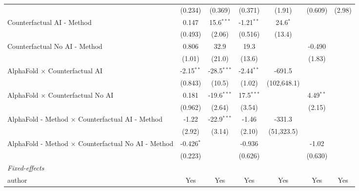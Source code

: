 \begin{tabular}{lcccccc}
                                                              & (0.234)       & (0.369)       & (0.371)      & (1.91)      & (0.609)      & (2.98)\\   
   Counterfactual AI - Method                                 & 0.147         & 15.6$^{***}$  & -1.21$^{**}$ & 24.6$^{*}$  &              &   \\   
                                                              & (0.493)       & (2.06)        & (0.516)      & (13.4)      &              &   \\   
   Counterfactual No AI - Method                              & 0.806         & 32.9          & 19.3         &             & -0.490       &   \\   
                                                              & (1.01)        & (21.0)        & (13.6)       &             & (1.83)       &   \\   
   AlphaFold $\times$ Counterfactual AI                       & -2.15$^{**}$  & -28.5$^{***}$ & -2.44$^{**}$ & -691.5      &              &   \\   
                                                              & (0.843)       & (10.5)        & (1.02)       & (102,648.1) &              &   \\   
   AlphaFold $\times$ Counterfactual No AI                    & 0.181         & -19.6$^{***}$ & 17.5$^{***}$ &             & 4.49$^{**}$  &   \\   
                                                              & (0.962)       & (2.64)        & (3.54)       &             & (2.15)       &   \\   
   AlphaFold - Method $\times$ Counterfactual AI - Method     & -1.22         & -22.9$^{***}$ & -1.46        & -331.3      &              &   \\   
                                                              & (2.92)        & (3.14)        & (2.10)       & (51,323.5)  &              &   \\   
   AlphaFold - Method $\times$ Counterfactual No AI - Method  & -0.426$^{*}$  &               & -0.936       &             & -1.02        &   \\   
                                                              & (0.223)       &               & (0.626)      &             & (0.630)      &   \\   
   \midrule
   \emph{Fixed-effects}\\
   author                                                     & Yes           & Yes           & Yes          & Yes         & Yes          & Yes\\  

\end{tabular}
